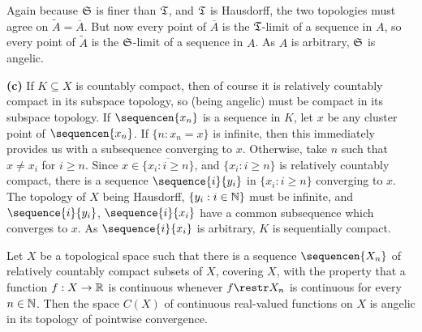 {Again because $\frak S$ is finer than $\frak T$, and $\frak T$ is
Hausdorff, the two topologies must agree on $\tilde A=\overline{A}$.
But now every point of $\overline{A}$ is the $\frak T$-limit of a
sequence in $A$, so every point of $\tilde A$ is the $\frak S$-limit of
a sequence in $A$.   As $A$ is arbitrary, $\frak S$ is angelic.

\medskip

{\bf (c)} If $K\subseteq X$ is countably compact, then of course it is
relatively countably compact in its subspace topology, so (being
angelic) must be compact in its subspace topology.   If
$\sequencen{x_n}$ is a sequence in $K$, let $x$ be any cluster point of
$\sequencen{x_n}$.   If $\{n:x_n=x\}$ is infinite, then this immediately
provides us with a subsequence converging to $x$.   Otherwise, take $n$
such that $x\ne x_i$ for $i\ge n$.   Since $x\in\overline{\{x_i:i\ge
n\}}$, and $\{x_i:i\ge n\}$ is relatively countably compact, there is a
sequence $\sequence{i}{y_i}$ in $\{x_i:i\ge n\}$ converging to $x$.
The topology of $X$ being Hausdorff, $\{y_i:i\in\Bbb N\}$ must be
infinite, and $\sequence{i}{y_i}$, $\sequence{i}{x_i}$ have a common
subsequence which converges to $x$.   As $\sequence{i}{x_i}$ is
arbitrary, $K$ is sequentially compact.
}%

 Let $X$ be a
topological space such that there is a sequence $\sequencen{X_n}$ of
relatively
countably compact subsets of $X$, covering $X$, with the property that a
function $f:X\to\Bbb R$ is continuous whenever $f\restr X_n$ is
continuous for every $n\in\Bbb N$.   Then the space $C(X)$ of continuous
real-valued functions on $X$ is angelic in its topology of pointwise
convergence.

